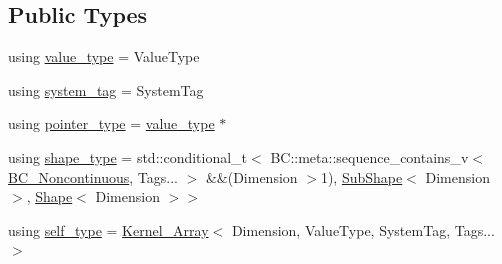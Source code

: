 \subsection*{Public Types}
\begin{DoxyCompactItemize}
\item 
using \hyperlink{structBC_1_1tensors_1_1exprs_1_1Kernel__Array_aa7afa4f492a6802a5f76a39df6d7431e}{value\+\_\+type} = Value\+Type
\item 
using \hyperlink{structBC_1_1tensors_1_1exprs_1_1Kernel__Array_a6372a58df2947790ef4539cfc3ca1d66}{system\+\_\+tag} = System\+Tag
\item 
using \hyperlink{structBC_1_1tensors_1_1exprs_1_1Kernel__Array_a63f8901ef5aa43d1aaa33698e5b2bcce}{pointer\+\_\+type} = \hyperlink{structBC_1_1tensors_1_1exprs_1_1Kernel__Array_aa7afa4f492a6802a5f76a39df6d7431e}{value\+\_\+type} $\ast$
\item 
using \hyperlink{structBC_1_1tensors_1_1exprs_1_1Kernel__Array_a9f2f703576ae567dcaf5e199bc3ef0f6}{shape\+\_\+type} = std\+::conditional\+\_\+t$<$ B\+C\+::meta\+::sequence\+\_\+contains\+\_\+v$<$ \hyperlink{classBC_1_1tensors_1_1exprs_1_1BC__Noncontinuous}{B\+C\+\_\+\+Noncontinuous}, Tags... $>$ \&\&(Dimension $>$1), \hyperlink{classBC_1_1tensors_1_1exprs_1_1SubShape}{Sub\+Shape}$<$ Dimension $>$, \hyperlink{classBC_1_1tensors_1_1exprs_1_1Shape}{Shape}$<$ Dimension $>$$>$
\item 
using \hyperlink{structBC_1_1tensors_1_1exprs_1_1Kernel__Array_a48e3325a79c498c34a6825c628a6f401}{self\+\_\+type} = \hyperlink{structBC_1_1tensors_1_1exprs_1_1Kernel__Array}{Kernel\+\_\+\+Array}$<$ Dimension, Value\+Type, System\+Tag, Tags... $>$
\end{DoxyCompactItemize}
